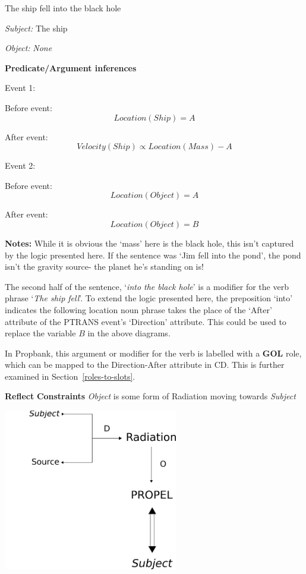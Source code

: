 \documentclass[../dissertation]{subfiles}
\begin{document}
The ship fell into the black hole

\textit{Subject:} The ship

\textit{Object:} \textit{None}
\smallskip

\textbf{Predicate/Argument inferences}

Event 1:

Before event:
\[Location(Ship) = A\]

After event:
\[Velocity(Ship) \propto Location(Mass) - A\]

Event 2:

Before event:
\[Location(Object) = A\]

After event:
\[Location(Object) = B\]
\bigskip

\textbf{Notes:} While it is obvious the `mass' here is the black hole, this isn't captured by the logic presented here. If the sentence was `Jim fell into the pond', the pond isn't the gravity source- the planet he's standing on is!

The second half of the sentence, `\textit{into the black hole}' is a modifier for the verb phrase `\textit{The ship fell}'. To extend the logic presented here, the preposition `into' indicates the following location noun phrase takes the place of the `After' attribute of the PTRANS event's `Direction' attribute. This could be used to replace the variable \(B\) in the above diagrams.

In Propbank, this argument or modifier for the verb is labelled with a \textbf{GOL} role, which can be mapped to the Direction-After attribute in CD. This is further examined in Section~\ref{roles-to-slots}.
\newpage

\textbf{Reflect}
\textbf{Constraints}
\textit{Object} is some form of Radiation moving towards \textit{Subject}
\bigskip

\begin{center}
	\includegraphics[height=200pt]{reflects-cd.png}
\end{center}
\end{document}
